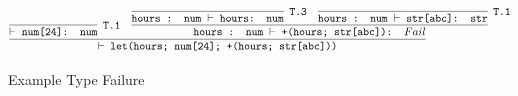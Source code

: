 \begin{figure}[htb]
\small
\[
\cinfer{$\vdash$ let(hours; num[24]; +(hours; str[abc]))}
  {\cinfer[T.1]{$\vdash$ num[24]: num}{ }
   &
   \cinfer{hours : num $\vdash$ +(hours; str[abc]): $Fail$}
     {\cinfer[T.3]{hours : num $\vdash$ hours: num}{ }
      &
      \cinfer[T.1]{hours : num $\vdash$ str[abc]: str}{ }
     }
  }
\]
\caption{Example Type Failure}
\label{fig:type_failure} 
\end{figure}
